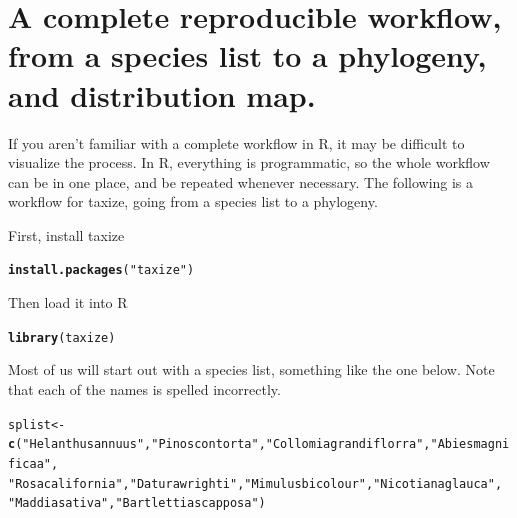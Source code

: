 \documentclass[10pt]{article}\usepackage[]{graphicx}\usepackage[]{color}
\makeatletter
\newcommand{\hlfunctioncall}[1]{\textcolor[rgb]{0.501960784313725,0,0.329411764705882}{\textbf{#1}}}%
\newcommand{\hlstring}[1]{\textcolor[rgb]{0.6,0.6,1}{#1}}%
\newenvironment{kframe}{%
 \def\at@end@of@kframe{}%
 \ifinner\ifhmode%
  \def\at@end@of@kframe{\end{minipage}}%
  \begin{minipage}{\columnwidth}%
 \fi\fi%
 \def\FrameCommand##1{\hskip\@totalleftmargin \hskip-\fboxsep
 \colorbox{shadecolor}{##1}\hskip-\fboxsep
     \hskip-\linewidth \hskip-\@totalleftmargin \hskip\columnwidth}%
 \MakeFramed {\advance\hsize-\width
   \@totalleftmargin\z@ \linewidth\hsize
   \@setminipage}}%
 {\par\unskip\endMakeFramed%
 \at@end@of@kframe}
\newenvironment{knitrout}{}{} %
\makeatother
\begin{document}
\section{A complete reproducible workflow, from a species list to a phylogeny, and distribution map.} 

If you aren't familiar with a complete workflow in R, it may be difficult to visualize the process. In R, everything is programmatic, so the whole workflow can be in one place, and be repeated whenever necessary. The following is a workflow for taxize, going from a species list to a phylogeny. 

First, install taxize

\begin{knitrout}
\color{fgcolor}\begin{kframe}
\begin{alltt}
\hlfunctioncall{install.packages}(\hlstring{"taxize"})
\end{alltt}
\end{kframe}
\end{knitrout}


Then load it into R

\begin{knitrout}
\color{fgcolor}\begin{kframe}
\begin{alltt}
\hlfunctioncall{library}(taxize)
\end{alltt}
\end{kframe}
\end{knitrout}


Most of us will start out with a species list, something like the one below. Note that each of the names is spelled incorrectly.

\begin{knitrout}
\color{fgcolor}\begin{kframe}
\begin{alltt}
splist <- \hlfunctioncall{c}(\hlstring{"Helanthus annuus"}, \hlstring{"Pinos contorta"}, \hlstring{"Collomia grandiflorra"}, \hlstring{"Abies magnificaa"}, 
    \hlstring{"Rosa california"}, \hlstring{"Datura wrighti"}, \hlstring{"Mimulus bicolour"}, \hlstring{"Nicotiana glauca"}, 
    \hlstring{"Maddia sativa"}, \hlstring{"Bartlettia scapposa"})
\end{alltt}
\end{kframe}
\end{knitrout}
\end{document}
